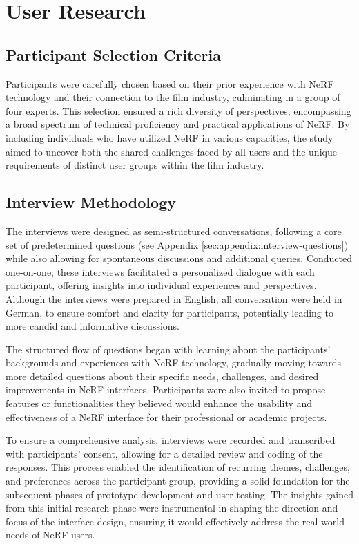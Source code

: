 %
\chapter{User Research}
\label{sec:user-research}

\section{Participant Selection Criteria}
\label{sec:user-research:criteria}

Participants were carefully chosen based on their prior experience with NeRF technology and their connection to the film industry, culminating in a group of four experts. 
This selection ensured a rich diversity of perspectives, encompassing a broad spectrum of technical proficiency and practical applications of NeRF. 
By including individuals who have utilized NeRF in various capacities, the study aimed to uncover both the shared challenges faced by all users and the unique requirements of distinct user groups within the film industry.

\section{Interview Methodology}
\label{sec:user-research:interview}

The interviews were designed as semi-structured conversations, following a core set of predetermined questions (see Appendix \ref{sec:appendix:interview-questions}) while also allowing for spontaneous discussions and additional queries. 
Conducted one-on-one, these interviews facilitated a personalized dialogue with each participant, offering insights into individual experiences and perspectives. 
Although the interviews were prepared in English, all conversation were held in German, to ensure comfort and clarity for participants, potentially leading to more candid and informative discussions.

The structured flow of questions began with learning about the participants' backgrounds and experiences with NeRF technology, gradually moving towards more detailed questions about their specific needs, challenges, and desired improvements in NeRF interfaces. 
Participants were also invited to propose features or functionalities they believed would enhance the usability and effectiveness of a NeRF interface for their professional or academic projects.

To ensure a comprehensive analysis, interviews were recorded and transcribed with participants' consent, allowing for a detailed review and coding of the responses. 
This process enabled the identification of recurring themes, challenges, and preferences across the participant group, providing a solid foundation for the subsequent phases of prototype development and user testing. 
The insights gained from this initial research phase were instrumental in shaping the direction and focus of the interface design, ensuring it would effectively address the real-world needs of NeRF users.

